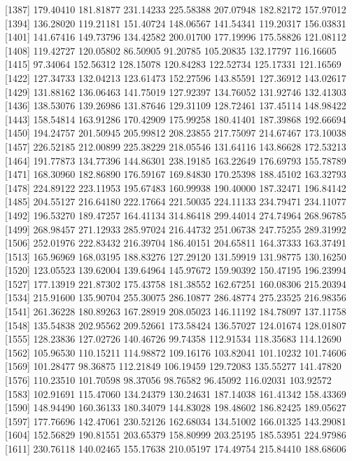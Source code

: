 \documentclass[
  10pt,
  a4paper,oneside]{article}
\begin{document}
{[}1387{]} 179.40410 181.81877 231.14233 225.58388 207.07948 182.82172 157.97012
{[}1394{]} 136.28020 119.21181 151.40724 148.06567 141.54341 119.20317 156.03831
{[}1401{]} 141.67416 149.73796 134.42582 200.01700 177.19996 175.58826 121.08112
{[}1408{]} 119.42727 120.05802 86.50905 91.20785 105.20835 132.17797 116.16605
{[}1415{]} 97.34064 152.56312 128.15078 120.84283 122.52734 125.17331 121.16569
{[}1422{]} 127.34733 132.04213 123.61473 152.27596 143.85591 127.36912 143.02617
{[}1429{]} 131.88162 136.06463 141.75019 127.92397 134.76052 131.92746 132.41303
{[}1436{]} 138.53076 139.26986 131.87646 129.31109 128.72461 137.45114 148.98422
{[}1443{]} 158.54814 163.91286 170.42909 175.99258 180.41401 187.39868 192.66694
{[}1450{]} 194.24757 201.50945 205.99812 208.23855 217.75097 214.67467 173.10038
{[}1457{]} 226.52185 212.00899 225.38229 218.05546 131.64116 143.86628 172.53213
{[}1464{]} 191.77873 134.77396 144.86301 238.19185 163.22649 176.69793 155.78789
{[}1471{]} 168.30960 182.86890 176.59167 169.84830 170.25398 188.45102 163.32793
{[}1478{]} 224.89122 223.11953 195.67483 160.99938 190.40000 187.32471 196.84142
{[}1485{]} 204.55127 216.64180 222.17664 221.50035 224.11133 234.79471 234.11077
{[}1492{]} 196.53270 189.47257 164.41134 314.86418 299.44014 274.74964 268.96785
{[}1499{]} 268.98457 271.12933 285.97024 216.44732 251.06738 247.75255 289.31992
{[}1506{]} 252.01976 222.83432 216.39704 186.40151 204.65811 164.37333 163.37491
{[}1513{]} 165.96969 168.03195 188.83276 127.29120 131.59919 131.98775 130.16250
{[}1520{]} 123.05523 139.62004 139.64964 145.97672 159.90392 150.47195 196.23994
{[}1527{]} 177.13919 221.87302 175.43758 181.38552 162.67251 160.08306 215.20394
{[}1534{]} 215.91600 135.90704 255.30075 286.10877 286.48774 275.23525 216.98356
{[}1541{]} 261.36228 180.89263 167.28919 208.05023 146.11192 184.78097 137.11758
{[}1548{]} 135.54838 202.95562 209.52661 173.58424 136.57027 124.01674 128.01807
{[}1555{]} 128.23836 127.02726 140.46726 99.74358 112.91534 118.35683 114.12690
{[}1562{]} 105.96530 110.15211 114.98872 109.16176 103.82041 101.10232 101.74606
{[}1569{]} 101.28477 98.36875 112.21849 106.19459 129.72083 135.55277 141.47820
{[}1576{]} 110.23510 101.70598 98.37056 98.76582 96.45092 116.02031 103.92572
{[}1583{]} 102.91691 115.47060 134.24379 130.24631 187.14038 161.41342 158.43369
{[}1590{]} 148.94490 160.36133 180.34079 144.83028 198.48602 186.82425 189.05627
{[}1597{]} 177.76696 142.47061 230.52126 162.68034 134.51002 166.01325 143.29081
{[}1604{]} 152.56829 190.81551 203.65379 158.80999 203.25195 185.53951 224.97986
{[}1611{]} 230.76118 140.02465 155.17638 210.05197 174.49754 215.84410 188.68606
\end{document}
